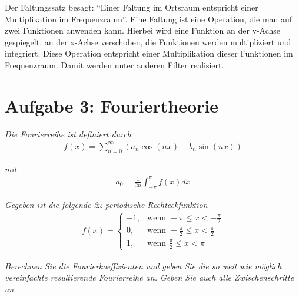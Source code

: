 \documentclass[
  ngerman,
  DIV=14
]{scrartcl}
\begin{document}
Der Faltungssatz besagt: \enquote{Einer Faltung im Ortsraum entspricht einer Multiplikation im Frequenzraum}. Eine Faltung ist eine Operation, die man auf zwei Funktionen anwenden kann. Hierbei wird eine Funktion an der y-Achse gespiegelt, an der x-Achse verschoben, die Funktionen werden multipliziert und integriert. Diese Operation entspricht einer Multiplikation dieser Funktionen im Frequenzraum. Damit werden unter anderen Filter realisiert.

\section*{Aufgabe 3: Fouriertheorie}

\emph{Die Fourierreihe ist definiert durch}
\begin{align*}
  f(x) = \sum_{n=0}^{\infty} (a_n \cos(n x) + b_n \sin(n x))
\end{align*}

\emph{mit}
\begin{align*}
a_0 = \frac{1}{2n}\int_{-\pi}^{\pi} f(x) dx  
\end{align*}

\emph{Gegeben ist die folgende 2π-periodische Rechteckfunktion}
\begin{align*}
f(x) = \begin{cases}
  -1, & \text{wenn } -\pi \leq x < -\frac{\pi}{2}\\
  0, & \text{wenn } -\frac{\pi}{2} \leq x < \frac{\pi}{2}\\
  1, & \text{wenn } \frac{\pi}{2} \leq x < \pi
\end{cases} 
\end{align*}


\emph{Berechnen Sie die Fourierkoeffizienten und geben Sie die so weit wie möglich vereinfachte resultierende Fourierreihe an. Geben Sie auch alle Zwischenschritte an.}
\end{document}
